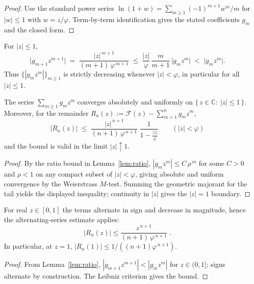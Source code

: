 \documentclass[11pt]{article}
\begin{document}
\begin{proposition}
\begin{proof}
Use the standard power series \(\ln(1+w)=\sum_{m\ge1}(-1)^{m+1}w^{m}/m\) for \(|w|\le1\) with \(w=z/\varphi\). Term‑by‑term identification gives the stated coefficients \(g_m\) and the closed form. \qedhere
\end{proof}

\begin{lemma}
\label{lem:ratio}
For \(|z|\le1\),
\[
  \bigl|g_{m+1}z^{m+1}\bigr|
  \;=\;\frac{|z|^{\,m+1}}{(m+1)\,\varphi^{\,m+1}}
  \;\le\;\frac{|z|}{\varphi}\,\frac{m}{m+1}\,\bigl|g_m z^m\bigr|
  \;<\;\bigl|g_m z^m\bigr|.
\]
Thus \(\{|g_m z^m|\}_{m\ge1}\) is strictly decreasing whenever \(|z|<\varphi\), in particular for all \(|z|\le 1\).
\end{lemma}

\begin{theorem}
\label{thm:absolute}
The series \(\sum_{m\ge1} g_m z^m\) converges absolutely and uniformly on \(\{\,z\in\mathbb C:\ |z|\le1\,\}\). Moreover, for the remainder \(R_n(z):=\mathcal F(z)-\sum_{m=1}^{n}g_m z^m\),
\[
  \boxed{\;
    |R_n(z)|
    \;\le\;
    \frac{|z|^{\,n+1}}{(n+1)\,\varphi^{\,n+1}}\;
    \frac{1}{1-\tfrac{|z|}{\varphi}}
    \qquad (|z|<\varphi)
  \;}
\]
and the bound is valid in the limit \(|z|\!\uparrow\!1\).
\end{theorem}

\begin{proof}
By the ratio bound in Lemma~\ref{lem:ratio}, \(|g_{m}z^m|\le C\,\rho^{\,m}\) for some \(C>0\) and \(\rho<1\) on any compact subset of \(|z|<\varphi\), giving absolute and uniform convergence by the Weierstrass \(M\)-test. Summing the geometric majorant for the tail yields the displayed inequality; continuity in \(|z|\) gives the \(|z|=1\) boundary. \qedhere
\end{proof}

\begin{proposition}
\label{prop:alt-tail}
For real \(z\in[0,1]\) the terms alternate in sign and decrease in magnitude, hence the alternating‑series estimate applies:
\[
  \boxed{\;
  |R_n(z)|\le \frac{z^{\,n+1}}{(n+1)\,\varphi^{\,n+1}}\;.
  \;}
\]
In particular, at \(z=1\), \(|R_n(1)|\le 1/((n+1)\varphi^{\,n+1})\).
\end{proposition}

\begin{proof}
From Lemma~\ref{lem:ratio}, \(|g_{m+1}z^{m+1}|<|g_m z^m|\) for \(z\in(0,1]\); signs alternate by construction. The Leibniz criterion gives the bound. \qedhere
\end{proof}


\end{proposition}
\end{document}
